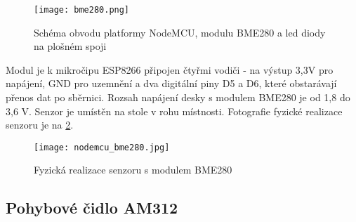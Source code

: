 \begin{figure}[H]
  \centering
  \texttt{[image: bme280.png]}
  \caption{Schéma obvodu platformy NodeMCU, modulu BME280 a led diody na plošném spoji}
  \label{fig:schema_esp_bme280}
\end{figure}

Modul je k mikročipu ESP8266 připojen čtyřmi vodiči - na výstup 3,3V pro napájení, GND pro uzemnění a dva digitální piny D5 a D6, které obstarávají přenos dat po sběrnici. Rozsah napájení desky s modulem BME280 je od 1,8 do 3,6 V. Senzor je umístěn na stole v rohu místnosti. Fotografie fyzické realizace senzoru je na \cref{fig:nodemcu_bme280}.

\begin{figure}[H]
  \centering
  \texttt{[image: nodemcu\_bme280.jpg]}
  \caption{Fyzická realizace senzoru s modulem BME280}
  \label{fig:nodemcu_bme280}
\end{figure} 

\subsection{Pohybové čidlo AM312}

